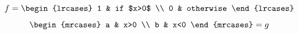 \documentclass{article}
\begin{document}
\[ f = \begin{lrcases} 1 & if $x>0$ \\ 0 & otherwise \end{lrcases} \]
\[ \begin{mrcases} a & x>0 \\ b & x<0 \end{mrcases} = g \]
\end{document}
